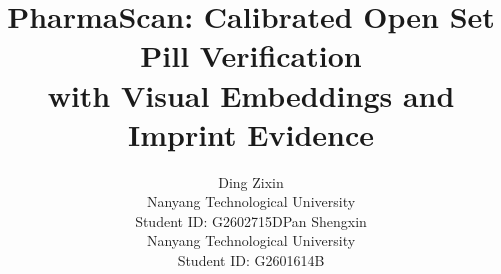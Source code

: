 \documentclass{article}
\title{PharmaScan: Calibrated Open Set Pill Verification\\with Visual Embeddings and Imprint Evidence}
\author{Ding Zixin\\Nanyang Technological University\\Student ID: G2602715D\And Pan Shengxin\\Nanyang Technological University\\Student ID: G2601614B}
\begin{document}
\setcounter{page}{1}
\maketitle
\setlength{\parskip}{3.5pt}



\FloatBarrier

\FloatBarrier

\FloatBarrier

\FloatBarrier
\clearpage
\setlength{\parskip}{5.5pt}
\begingroup
\small


\endgroup
\FloatBarrier
\clearpage
\appendix
\setcounter{figure}{0}
\setcounter{table}{0}
\renewcommand{\thefigure}{A\arabic{figure}}
\renewcommand{\thetable}{A\arabic{table}}
\renewcommand{\theHfigure}{appendix.\arabic{figure}}
\renewcommand{\theHtable}{appendix.\arabic{table}}

\FloatBarrier
\end{document}

